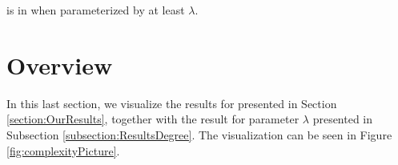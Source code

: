 \begin{corollary}\label{cor:Ld:variation:FPT}
    \HL is in \FPT when parameterized by at least $\lambda$.
\end{corollary}

\section{Overview}

In this last section, we visualize the results for \HLdeg presented in Section \ref{section:OurResults},
together with the result for parameter $\lambda$ presented in Subsection \ref{subsection:ResultsDegree}.
The visualization can be seen in Figure \ref{fig:complexityPicture}.

